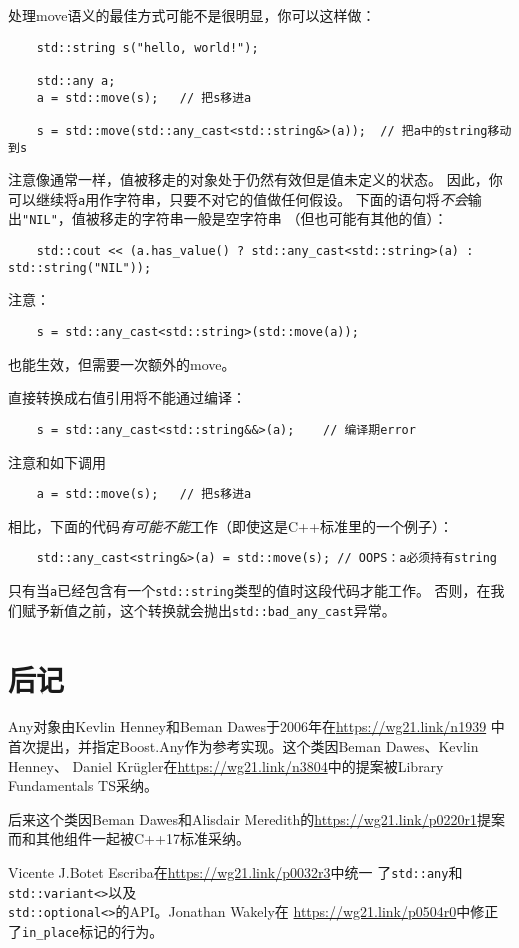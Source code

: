 处理move语义的最佳方式可能不是很明显，你可以这样做：
\begin{lstlisting}
    std::string s("hello, world!");

    std::any a;
    a = std::move(s);   // 把s移进a

    s = std::move(std::any_cast<std::string&>(a));  // 把a中的string移动到s
\end{lstlisting}
注意像通常一样，值被移走的对象处于仍然有效但是值未定义的状态。
因此，你可以继续将\texttt{a}用作字符串，只要不对它的值做任何假设。
下面的语句将\emph{不会}输出\texttt{"NIL"}，值被移走的字符串一般是空字符串
（但也可能有其他的值）：
\begin{lstlisting}
    std::cout << (a.has_value() ? std::any_cast<std::string>(a) : std::string("NIL"));
\end{lstlisting}
注意：
\begin{lstlisting}
    s = std::any_cast<std::string>(std::move(a));
\end{lstlisting}
也能生效，但需要一次额外的move。

直接转换成右值引用将不能通过编译：
\begin{lstlisting}
    s = std::any_cast<std::string&&>(a);    // 编译期error
\end{lstlisting}
注意和如下调用
\begin{lstlisting}
    a = std::move(s);   // 把s移进a
\end{lstlisting}
相比，下面的代码\emph{有可能不能}工作（即使这是C++标准里的一个例子）：
\begin{lstlisting}
    std::any_cast<string&>(a) = std::move(s); // OOPS：a必须持有string
\end{lstlisting}
只有当\texttt{a}已经包含有一个\texttt{std::string}类型的值时这段代码才能工作。
否则，在我们赋予新值之前，这个转换就会抛出\texttt{std::bad\_any\_cast}异常。


\section{后记}
Any对象由Kevlin Henney和Beman Dawes于2006年在\url{https://wg21.link/n1939}
中首次提出，并指定Boost.Any作为参考实现。这个类因Beman Dawes、Kevlin Henney、
Daniel Krügler在\url{https://wg21.link/n3804}中的提案被Library Fundamentals TS采纳。

后来这个类因Beman Dawes和Alisdair Meredith的\url{https://wg21.link/p0220r1}提案
而和其他组件一起被C++17标准采纳。

Vicente J.Botet Escriba在\url{https://wg21.link/p0032r3}中统一
了\texttt{std::any}和\texttt{std::variant<>}以及\\
\texttt{std::optional<>}的API。Jonathan Wakely在
\url{https://wg21.link/p0504r0}中修正了\texttt{in\_place}标记的行为。